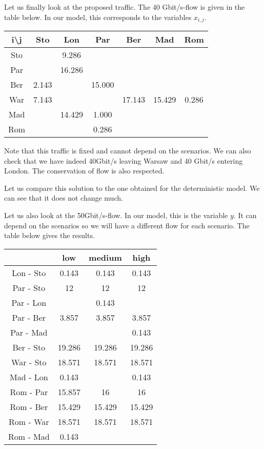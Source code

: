 Let us finally look at the proposed traffic. The 40 Gbit/s-flow is given in the table below. In our model, this corresponds to the variables $x_{i,j}$.
\begin{center}
\begin{tabular}{|c|c|c|c|c|c|c|}
\hline 
i\textbackslash j & Sto & Lon & Par & Ber & Mad & Rom \\ 
\hline 
Sto &  & 9.286 &  &  &  &  \\ 
\hline 
Par &  & 16.286 &  &  &  &  \\ 
\hline 
Ber & 2.143 &  & 15.000 &  &  &  \\ 
\hline 
War & 7.143 &  &  & 17.143 & 15.429 & 0.286 \\ 
\hline 
Mad &  & 14.429 & 1.000 &  &  &  \\ 
\hline 
Rom &  &  & 0.286 &  &  &  \\ 
\hline 
\end{tabular} 
\end{center}

Note that this traffic is fixed and cannot depend on the scenarios. We can also check that we have indeed 40Gbit/s leaving Warsaw and 40 Gbit/s entering London. The conservation of flow is also respected. 

Let us compare this solution to the one obtained for the deterministic model. We can see that it does not change much. 

Let us also look at the 50Gbit/s-flow. In our model, this is the variable $y$. It can depend on the scenarios so we will have a different flow for each scenario. The table below gives the results.

\begin{center}
\begin{tabular}{|c|c|c|c|}
\hline 
 & low & medium & high \\ 
\hline 
Lon - Sto & 0.143 & 0.143 & 0.143 \\ 
\hline 
Par - Sto & 12 & 12 & 12 \\ 
\hline 
Par - Lon &  & 0.143 &  \\ 
\hline 
Par - Ber & 3.857 & 3.857 & 3.857 \\ 
\hline 
Par - Mad &  &  & 0.143 \\ 
\hline 
Ber - Sto & 19.286 & 19.286 & 19.286 \\ 
\hline 
War - Sto & 18.571 & 18.571 & 18.571 \\ 
\hline 
Mad - Lon & 0.143 &  & 0.143 \\ 
\hline 
Rom - Par & 15.857 & 16 & 16 \\ 
\hline 
Rom - Ber & 15.429 & 15.429 & 15.429 \\ 
\hline 
Rom - War & 18.571 & 18.571 & 18.571 \\ 
\hline 
Rom - Mad & 0.143 &  &  \\ 
\hline 
\end{tabular} 
\end{center}